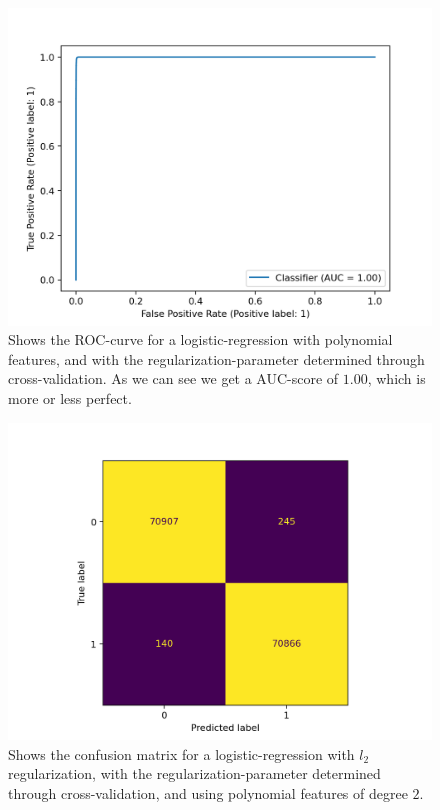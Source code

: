 \documentclass{article}
\begin{document}
\begin{figure}
	\centering
	\includegraphics[scale=0.8]{lr_poly_roc_curve}
	\caption{Shows the ROC-curve for a logistic-regression with polynomial
		features, and with the regularization-parameter determined through
		cross-validation. As we can see we get a AUC-score of $1.00$, which is
		more or less perfect.}
	\label{lrroccurvepoly}
\end{figure}

\begin{figure}
	\centering
	\includegraphics[scale=0.8]{lr_poly_confusion_mat}
	\caption{Shows the confusion matrix for a logistic-regression with
		$l_2$ regularization, with the regularization-parameter
		determined through cross-validation, and using polynomial
		features of degree $2$.}
	\label{lrpolyconfusionmat}
\end{figure}
\end{document}
